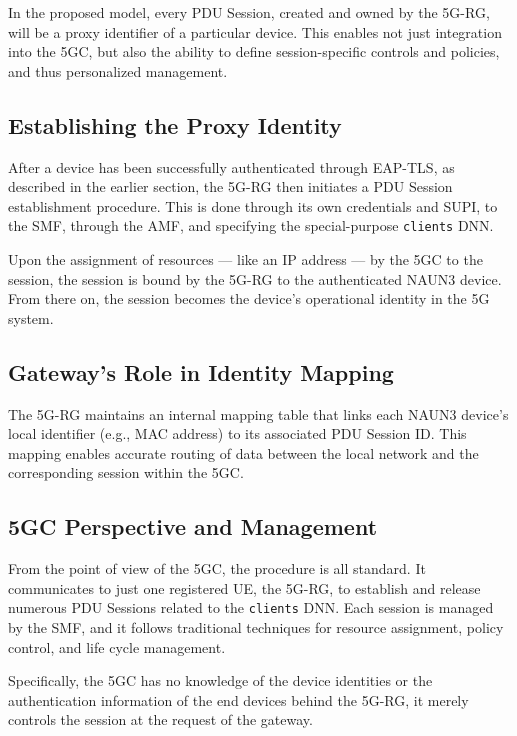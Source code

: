 In the proposed model, every \ac{PDU} Session, created and owned by the \ac{5G-RG}, will be a proxy identifier of a particular device. This enables not just integration into the \ac{5GC}, but also the ability to define session-specific controls and policies, and thus personalized management.

\subsection{Establishing the Proxy Identity}

After a device has been successfully authenticated through \ac{EAP-TLS}, as described in the earlier section, the \ac{5G-RG} then initiates a \ac{PDU} Session establishment procedure. This is done through its own credentials and \ac{SUPI}, to the \ac{SMF}, through the \ac{AMF}, and specifying the special-purpose \texttt{clients} \ac{DNN}.

Upon the assignment of resources — like an \ac{IP} address — by the \ac{5GC} to the session, the session is bound by the \ac{5G-RG} to the authenticated \ac{NAUN3} device. From there on, the session becomes the device’s operational identity in the \ac{5G} system.

\subsection{Gateway’s Role in Identity Mapping}

The \ac{5G-RG} maintains an internal mapping table that links each \ac{NAUN3} device’s local identifier (e.g., \ac{MAC} address) to its associated \ac{PDU} Session ID. This mapping enables accurate routing of data between the local network and the corresponding session within the \ac{5GC}.

\subsection{\ac{5GC} Perspective and Management}

From the point of view of the \ac{5GC}, the procedure is all standard. It communicates to just one registered \ac{UE}, the \ac{5G-RG}, to establish and release numerous \ac{PDU} Sessions related to the \texttt{clients} \ac{DNN}. Each session is managed by the \ac{SMF}, and it follows traditional techniques for resource assignment, policy control, and life cycle management.

Specifically, the \ac{5GC} has no knowledge of the device identities or the authentication information of the end devices behind the \ac{5G-RG}, it merely controls the session at the request of the gateway.

